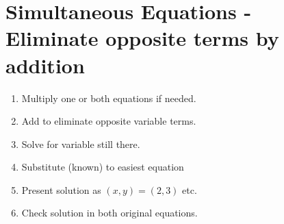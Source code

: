 \documentclass[12pt, a4paper, addpoints]{exam}
\begin{document}
\section*{Simultaneous Equations - Eliminate opposite terms by addition}

\begin{mdframed}[backgroundcolor=gray!20, roundcorner=5pt] %
\begin{multicols}{2}
\begin{enumerate}
    \item Multiply one or both equations if needed.
    \item Add  to eliminate opposite variable terms.
    \item Solve for  variable still there.
    \item Substitute (known) to easiest equation 
    \item Present solution as  \((x, y) = (2, 3)\) etc.
    \item Check  solution in both original equations.
\end{enumerate}
\end{multicols}
\end{mdframed}
\end{document}
